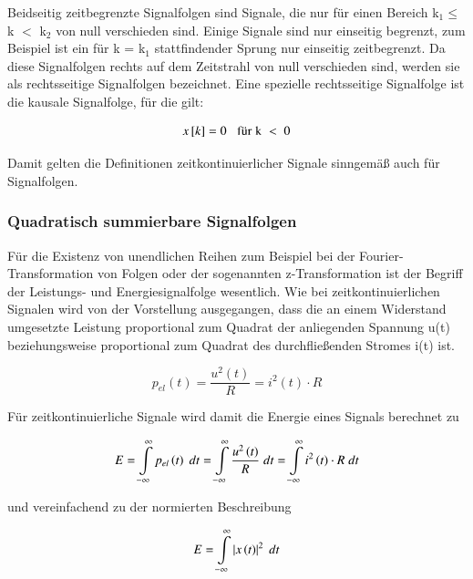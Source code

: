 \noindent Beidseitig zeitbegrenzte Signalfolgen sind Signale, die nur f\"{u}r einen Bereich k$_{1}\mathrm{\le}$ k $\mathrm{<}$ k$_{2}$ von null verschieden sind. Einige Signale sind nur einseitig begrenzt, zum Beispiel ist ein f\"{u}r k = k$_{1}$ stattfindender Sprung nur einseitig zeitbegrenzt. Da diese Signalfolgen rechts auf dem Zeitstrahl von null verschieden sind, werden sie als rechtsseitige Signalfolgen bezeichnet. Eine spezielle rechtsseitige Signalfolge ist die kausale Signalfolge, f\"{u}r die gilt:

\begin{equation}\label{eq:threefour}
x\left[k\right]= 0\rm \; \; \; \text{für}\; k\; <{\rm \; 0}
\end{equation}

\noindent Damit gelten die Definitionen zeitkontinuierlicher Signale sinngem\"{a}{\ss} auch f\"{u}r Signalfolgen.

\subsubsection{Quadratisch summierbare Signalfolgen}

\noindent Für die Existenz von unendlichen Reihen zum Beispiel bei der Fourier-Transformation von Folgen oder der sogenannten z-Transformation ist der Begriff der Leistungs- und Energiesignalfolge wesentlich. Wie bei zeitkontinuierlichen Signalen wird von der Vorstellung ausgegangen, dass die an einem Widerstand umgesetzte Leistung proportional zum Quadrat der anliegenden Spannung u(t) beziehungsweise proportional zum Quadrat des durchfließenden Stromes i(t) ist.

\begin{equation}\label{eq:threefive}
p_{el} \left(t\right)=\frac{u^{2} \left(t\right)}{R} =i^{2} \left(t\right)\cdot R
\end{equation}

\noindent F\"{u}r zeitkontinuierliche Signale wird damit die Energie eines Signals berechnet zu

\begin{equation}\label{eq:threesix}
E=\int\limits _{-\infty }^{\infty }p_{el} \left(t\right){\rm \; }dt =\int\limits  _{-\infty }^{\infty }\frac{u^{2} \left(t\right)}{R} {\rm \; }dt =\int\limits  _{-\infty }^{\infty }i^{2} \left(t\right)\cdot R{\rm \; }dt 
\end{equation}

\noindent und vereinfachend zu der normierten Beschreibung 

\begin{equation}\label{eq:threeseven}
E=\int\limits _{-\infty }^{\infty }\left|x\left(t\right)\right|^{2} {\rm \; }dt 
\end{equation}


